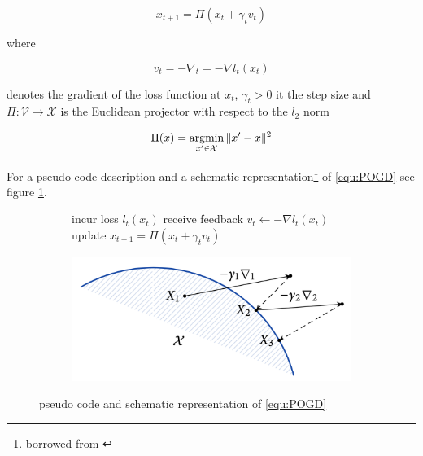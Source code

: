 \begin{equation}
   \tag{POGD}
        x_{t+1} = \Pi(x_t + \gamma_t v_t)
   \label{equ:POGD}
\end{equation}

where

\begin{equation*}
    v_t = -\nabla_t = -\nabla l_t(x_t)
\end{equation*}

denotes the gradient of the loss function at $x_t$, $\gamma_t > 0 $ it the step size and $\Pi: \mathcal{V} \to \mathcal{X}$ is the Euclidean projector with respect to the $l_2$ norm

\begin{equation}
    \Pi(x) = \operatorname*{\arg\!\min}_{x'\in \mathcal{X}}\|x'-x\|^{2}
    \label{equ:gradient}
\end{equation}

For a pseudo code description and a schematic representation\footnote{borrowed from \cite[Chapter 2]{HDRmertikopoulos}} of \ref{equ:POGD} see figure \ref{fig:POGDpseudoCodeAndScheme}.

\begin{figure}[H]
\centering
\begin{subfigure}{.5\textwidth}
    \begin{algorithm}[H]
    \DontPrintSemicolon
     {
    incur loss $l_t(x_t)$ \;
    receive feedback $v_t \gets -\nabla l_t(x_t)$ \;
    update $x_{t+1} = \Pi(x_t + \gamma_t v_t)$ \;
    }
    \end{algorithm}
\end{subfigure}%
\begin{subfigure}{.5\textwidth}
  \centering
  \includegraphics[width=\textwidth]{logos/POGDscheme.png}
\end{subfigure}
\caption{pseudo code and schematic representation of \ref{equ:POGD}}
\label{fig:POGDpseudoCodeAndScheme}
\end{figure}

